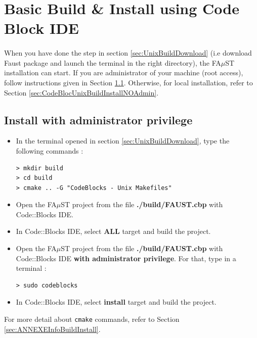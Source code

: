 \section{Basic Build \& Install using Code Block IDE}\label{sec:UnixInstallCodeBlock}
\paragraph{}When you have done the step in section  \ref{sec:UnixBuildDownload} (i.e download Faust package and launch the terminal in the right directory),  the FA$\mu$ST installation can start. If you are administrator of your machine (root access), follow instructions given in Section \ref{sec:CodeBlocUnixBuildInstallAdmin}. Otherwise, for local installation, refer to Section \ref{sec:CodeBlocUnixBuildInstallNOAdmin}. 

\subsection{Install with administrator privilege}\label{sec:CodeBlocUnixBuildInstallAdmin}
\begin{itemize}
\item In the terminal opened in section 
\ref{sec:UnixBuildDownload}, type the following commands : 
\begin{lstlisting}
> mkdir build
> cd build
> cmake .. -G "CodeBlocks - Unix Makefiles"
\end{lstlisting}

\item Open the FA$\mu$ST project from the file \textbf{./build/FAUST.cbp} with Code::Blocks IDE. 
\item In Code::Blocks IDE, select \textbf{ALL} target and build the project. 
\item Open the FA$\mu$ST project from the file \textbf{./build/FAUST.cbp} with Code::Blocks IDE \textbf{with administrator privilege}. For that, type in a terminal :
\begin{lstlisting}
> sudo codeblocks
\end{lstlisting}
\item In Code::Blocks IDE, select \textbf{install} target and build the project. 
\end{itemize}

For more detail about \texttt{cmake} commands, refer to Section \ref{sec:ANNEXEInfoBuildInstall}.


